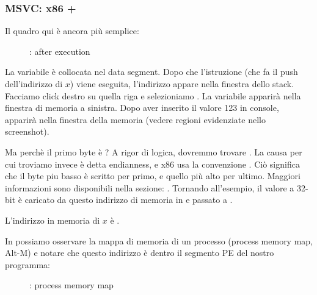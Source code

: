\clearpage
\subsubsection{MSVC: x86 + \olly}
\myindex{\olly}

Il quadro qui è ancora più semplice:

\begin{figure}[H]
\centering
{}
\caption{\olly: after \scanf execution}
\label{fig:scanf_ex2_olly_1}
\end{figure}

La variabile è collocata nel data segment.
Dopo che l'istruzione \PUSH (che fa il push dell'indirizzo di $x$) viene eseguita, 
l'indirizzo appare nella finestra dello stack. Facciamo click destro su quella riga e selezioniamo .
La variabile apparirà nella finestra di memoria a sinistra.
Dopo aver inserito il valore 123 in console, 
 apparirà nella finestra della memoria (vedere regioni evidenziate nello screenshot).

Ma perchè il primo byte è ?
A rigor di logica, dovremmo trovare .
La causa per cui troviamo invece  è detta \gls{endianness}, e x86 usa la convenzione .
Ciò significa che il byte piu basso è scritto per primo, e quello più alto per ultimo.
Maggiori informazioni sono disponibili nella sezione: .
Tornando all'esempio, il valore a 32-bit è caricato da questo indirizzo di memoria in \EAX e passato a \printf.

L'indirizzo in memoria di $x$ è .

\clearpage
In \olly possiamo osservare la mappa di memoria di un processo  (process memory map, Alt-M)
e notare che questo indirizzo è dentro il segmento PE  del nostro programma:

\begin{figure}[H]
\centering
{}
\caption{\olly: process memory map}
\label{fig:scanf_ex2_olly_2}
\end{figure}


